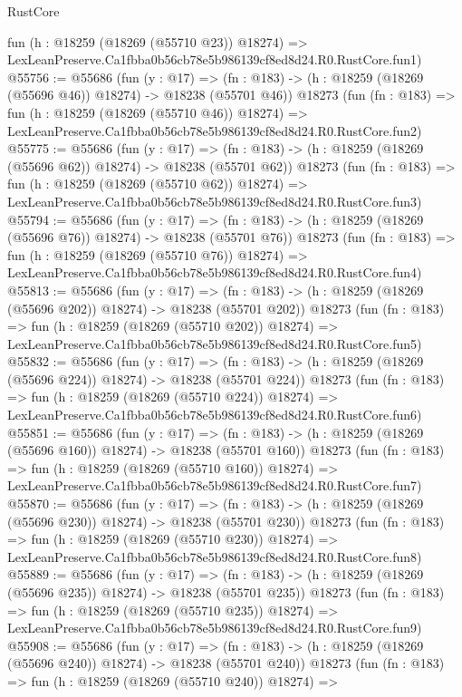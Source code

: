 \begin{lexlean}{RustCore}
\begin{coremodule}
    fun (h : @18259 (@18269 (@55710 @23)) @18274) =>
    LexLeanPreserve.Ca1fbba0b56cb78e5b986139cf8ed8d24.R0.RustCore.fun1)
@55756 := @55686
    (fun (y : @17) =>
    (fn : @183) -> (h : @18259 (@18269 (@55696 @46)) @18274) -> @18238 (@55701 @46))
    @18273
    (fun (fn : @183) =>
    fun (h : @18259 (@18269 (@55710 @46)) @18274) =>
    LexLeanPreserve.Ca1fbba0b56cb78e5b986139cf8ed8d24.R0.RustCore.fun2)
@55775 := @55686
    (fun (y : @17) =>
    (fn : @183) -> (h : @18259 (@18269 (@55696 @62)) @18274) -> @18238 (@55701 @62))
    @18273
    (fun (fn : @183) =>
    fun (h : @18259 (@18269 (@55710 @62)) @18274) =>
    LexLeanPreserve.Ca1fbba0b56cb78e5b986139cf8ed8d24.R0.RustCore.fun3)
@55794 := @55686
    (fun (y : @17) =>
    (fn : @183) -> (h : @18259 (@18269 (@55696 @76)) @18274) -> @18238 (@55701 @76))
    @18273
    (fun (fn : @183) =>
    fun (h : @18259 (@18269 (@55710 @76)) @18274) =>
    LexLeanPreserve.Ca1fbba0b56cb78e5b986139cf8ed8d24.R0.RustCore.fun4)
@55813 := @55686
    (fun (y : @17) =>
    (fn : @183) -> (h : @18259 (@18269 (@55696 @202)) @18274) -> @18238 (@55701 @202))
    @18273
    (fun (fn : @183) =>
    fun (h : @18259 (@18269 (@55710 @202)) @18274) =>
    LexLeanPreserve.Ca1fbba0b56cb78e5b986139cf8ed8d24.R0.RustCore.fun5)
@55832 := @55686
    (fun (y : @17) =>
    (fn : @183) -> (h : @18259 (@18269 (@55696 @224)) @18274) -> @18238 (@55701 @224))
    @18273
    (fun (fn : @183) =>
    fun (h : @18259 (@18269 (@55710 @224)) @18274) =>
    LexLeanPreserve.Ca1fbba0b56cb78e5b986139cf8ed8d24.R0.RustCore.fun6)
@55851 := @55686
    (fun (y : @17) =>
    (fn : @183) -> (h : @18259 (@18269 (@55696 @160)) @18274) -> @18238 (@55701 @160))
    @18273
    (fun (fn : @183) =>
    fun (h : @18259 (@18269 (@55710 @160)) @18274) =>
    LexLeanPreserve.Ca1fbba0b56cb78e5b986139cf8ed8d24.R0.RustCore.fun7)
@55870 := @55686
    (fun (y : @17) =>
    (fn : @183) -> (h : @18259 (@18269 (@55696 @230)) @18274) -> @18238 (@55701 @230))
    @18273
    (fun (fn : @183) =>
    fun (h : @18259 (@18269 (@55710 @230)) @18274) =>
    LexLeanPreserve.Ca1fbba0b56cb78e5b986139cf8ed8d24.R0.RustCore.fun8)
@55889 := @55686
    (fun (y : @17) =>
    (fn : @183) -> (h : @18259 (@18269 (@55696 @235)) @18274) -> @18238 (@55701 @235))
    @18273
    (fun (fn : @183) =>
    fun (h : @18259 (@18269 (@55710 @235)) @18274) =>
    LexLeanPreserve.Ca1fbba0b56cb78e5b986139cf8ed8d24.R0.RustCore.fun9)
@55908 := @55686
    (fun (y : @17) =>
    (fn : @183) -> (h : @18259 (@18269 (@55696 @240)) @18274) -> @18238 (@55701 @240))
    @18273
    (fun (fn : @183) =>
    fun (h : @18259 (@18269 (@55710 @240)) @18274) =>

\end{coremodule}
\end{lexlean}
